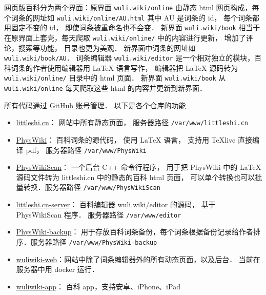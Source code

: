 
网页版百科分为两个界面：原界面 \verb|wuli.wiki/online| 由静态 html 网页构成，每个词条的网址如 \verb|wuli.wiki/online/AU.html| 其中 AU 是词条的 id， 每个词条都用固定不变的 id， 即使词条被重命名也不会变．  新界面 \verb|wuli.wiki/book| 相当于在原界面上套壳，每天爬取 \verb|wuli.wiki/online/| 中的内容进行更新， 增加了评论，搜索等功能， 目录也更为美观． 新界面中词条的网址如 \verb|wuli.wiki/book/AU|．
词条编辑器 \verb|wuli.wiki/editor| 是一个相对独立的模块，百科词条的作者使用编辑器用 LaTeX 语言写作， 编辑器把 LaTeX 源码转为 \verb|wuli.wiki/online/| 目录中的 html 页面． 新界面 \verb|wuli.wiki/book| 从 \verb|wuli.wiki/online| 每天爬取这些 html 的内容并更新到新界面．

所有代码通过 \href{https://github.com/MacroUniverse}{GitHub 账号}管理． 以下是各个仓库的功能
\begin{itemize}
\item \href{https://github.com/MacroUniverse/littleshi.cn}{littleshi.cn}： 网站中所有静态页面， 服务器路径 \verb|/var/www/littleshi.cn|
\item \href{https://github.com/MacroUniverse/PhysWiki}{PhysWiki}： 百科词条的源代码， 使用 LaTeX 语言， 支持用 TeXlive 直接编译 pdf， 服务器路径 \verb|/var/www/PhysWiki|
\item \href{https://github.com/MacroUniverse/PhysWikiScan}{PhysWikiScan}： 一个后台 C++ 命令行程序， 用于把 PhysWiki 中的 LaTeX 源码文件转为 littleshi.cn 中的静态的百科 html 页面， 可以单个转换也可以批量转换．服务器路径 \verb|/var/www/PhysWikiScan|
\item \href{https://github.com/MacroUniverse/littleshi.cn-server}{littleshi.cn-server}： 百科编辑器 wuli.wiki/editor 的源码， 基于 PhysWikiScan 程序． 服务器路径 \verb|/var/www/editor|
\item \href{https://github.com/MacroUniverse/PhysWiki-backup}{PhysWiki-backup}： 用于存放百科词条备份，每个词条根据备份记录给作者排序．服务器路径 \verb|/var/www/PhysWiki-backup|
\item \href{https://github.com/MacroUniverse/wuliwiki-web}{wuliwiki-web}：网站中除了词条编辑器外的所有动态页面，以及后台． 当前在服务器中用 docker 运行．
\item \href{https://github.com/MacroUniverse/wuliwiki-app}{wuliwiki-app}： 百科 app，支持安卓、iPhone、iPad
\end{itemize}
